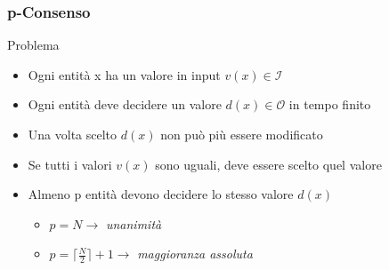 	
		\begin{frame}
			\frametitle{p-Consenso}		
			\begin{block}{Problema}
				\begin{itemize}
					\item Ogni entità x ha un valore in input $v(x) \in \mathcal{I}$
					\item Ogni entità deve decidere un valore $d(x) \in \mathcal{O}$ in tempo finito
					\item Una volta scelto $d(x)$ non può più essere modificato
					\item Se tutti i valori $v(x)$ sono uguali, deve essere scelto quel valore
					\item Almeno p entità devono decidere lo stesso valore $d(x)$
					\begin{itemize}
						\footnotesize
						\item $p = N \rightarrow$ \emph{unanimità}
						\item $p = \lceil\frac{N}{2}\rceil +1 \rightarrow$ \emph{maggioranza assoluta}
					\end{itemize}
				\end{itemize}
			\end{block}			
		\end{frame}
	
